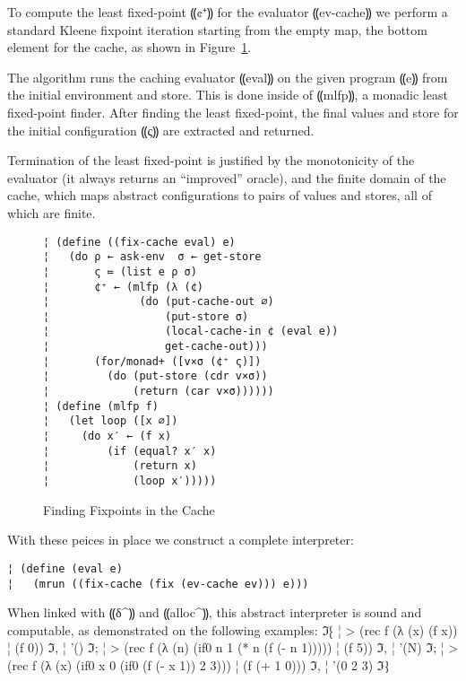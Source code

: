 To compute the least fixed-point ⸨¢⁺⸩ for the evaluator ⸨ev-cache⸩ we perform a
standard Kleene fixpoint iteration starting from the empty map, the bottom
element for the cache, as shown in Figure~\ref{f:fixing}.

The algorithm runs the caching evaluator ⸨eval⸩ on the given program ⸨e⸩ from
the initial environment and store. This is done inside of ⸨mlfp⸩, a monadic
least fixed-point finder. After finding the least fixed-point, the final values
and store for the initial configuration ⸨ς⸩ are extracted and returned.

Termination of the least fixed-point is justified by the monotonicity of the
evaluator (it always returns an “improved” oracle), and the finite domain of
the cache, which maps abstract configurations to pairs of values and stores,
all of which are finite.

\begin{figure} %
\begin{lstlisting}
¦ (define ((fix-cache eval) e)  
¦   (do ρ ← ask-env  σ ← get-store
¦       ς ≔ (list e ρ σ)
¦       ¢⁺ ← (mlfp (λ (¢) 
¦              (do (put-cache-out ∅)
¦                  (put-store σ)
¦                  (local-cache-in ¢ (eval e))
¦                  get-cache-out)))
¦       (for/monad+ ([v×σ (¢⁺ ς)])
¦         (do (put-store (cdr v×σ))
¦             (return (car v×σ))))))
¦ (define (mlfp f)
¦   (let loop ([x ∅])
¦     (do x′ ← (f x)
¦         (if (equal? x′ x)
¦             (return x)
¦             (loop x′)))))
\end{lstlisting}
\caption{Finding Fixpoints in the Cache}
\label{f:fixing}
\end{figure} %

With these peices in place we construct a complete interpreter:
\begin{lstlisting}
¦ (define (eval e)
¦   (mrun ((fix-cache (fix (ev-cache ev))) e)))
\end{lstlisting}
When linked with ⸨δ^⸩ and ⸨alloc^⸩, this abstract interpreter is sound and
computable, as demonstrated on the following examples:
ℑ⁅
¦ > (rec f (λ (x) (f x))
¦     (f 0))
ℑ,
¦ '()
ℑ;
¦ > (rec f (λ (n) (if0 n 1 (* n (f (- n 1)))))
¦     (f 5))
ℑ,
¦ '(N)
ℑ;
¦ > (rec f (λ (x) (if0 x 0 (if0 (f (- x 1)) 2 3)))
¦      (f (+ 1 0)))
ℑ,
¦ '(0 2 3)
ℑ⁆
